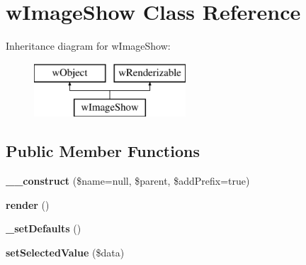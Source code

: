 \hypertarget{classwImageShow}{
\section{wImageShow Class Reference}
\label{classwImageShow}
}
Inheritance diagram for wImageShow:\begin{figure}[H]
\begin{center}
\leavevmode
\includegraphics[height=2.000000cm]{classwImageShow}
\end{center}
\end{figure}
\subsection*{Public Member Functions}
\begin{DoxyCompactItemize}
\item 
\hypertarget{classwImageShow_a286a317daf9c583427e763994b1e8aae}{
{\bfseries \_\-\_\-construct} (\$name=null, \$parent, \$addPrefix=true)}
\label{classwImageShow_a286a317daf9c583427e763994b1e8aae}

\item 
\hypertarget{classwImageShow_a6004d59ba067051327e88e40a2c07599}{
{\bfseries render} ()}
\label{classwImageShow_a6004d59ba067051327e88e40a2c07599}

\item 
\hypertarget{classwImageShow_a0c5166f9513959056a2d993750207616}{
{\bfseries \_\-setDefaults} ()}
\label{classwImageShow_a0c5166f9513959056a2d993750207616}

\item 
\hypertarget{classwImageShow_a1f7e3d0cd9e670c817bdf9126ba1e7be}{
{\bfseries setSelectedValue} (\$data)}
\label{classwImageShow_a1f7e3d0cd9e670c817bdf9126ba1e7be}

\end{DoxyCompactItemize}
